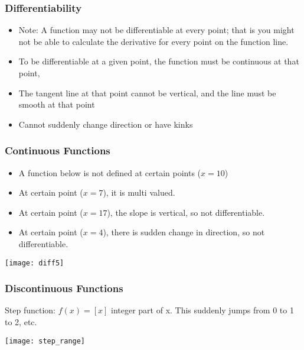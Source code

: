  \begin{frame}[fragile]\frametitle{Differentiability}
\begin{itemize}
\item Note: A function may not be differentiable at every point; that is you might not be able to calculate the derivative for
every point on the function line. 
\item To be differentiable at a given point, the function must be continuous at that point, 
\item The tangent line at that point cannot be vertical, and the line must be smooth at that point 
\item Cannot suddenly change direction or have kinks
\end{itemize}
\end{frame}

 \begin{frame}[fragile]\frametitle{Continuous Functions}
\begin{itemize}
\item A function below is not defined at certain points ($x = 10$)
\item At certain point ($x = 7$), it is multi valued.
\item At certain point ($x = 17$), the slope is vertical, so not differentiable.
\item At certain point ($x = 4$), there is sudden change in direction, so not differentiable.
\end{itemize}
\begin{center}
\texttt{[image: diff5]}
\end{center}
\end{frame}

 \begin{frame}[fragile]\frametitle{Discontinuous Functions}
Step function: $f(x) = [x]$ integer part of x. This suddenly jumps from 0 to 1 to 2, etc.
\begin{center}
\texttt{[image: step\_range]}
\end{center}
\end{frame}

